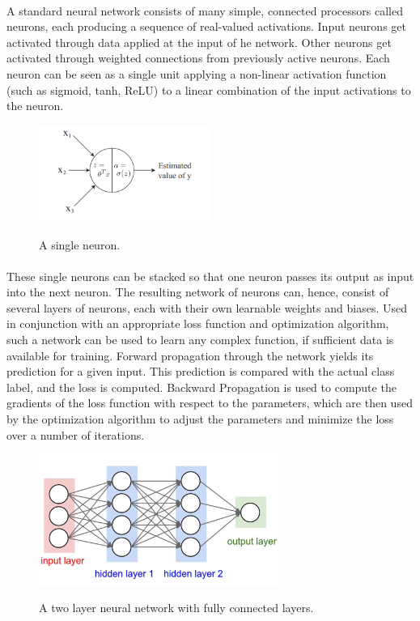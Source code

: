 \documentclass[12pt, a4paper]{report}
\begin{document}
\paragraph{}
A standard neural network consists of many simple, connected processors called neurons, each producing a sequence of real-valued activations. Input neurons get activated through data applied at the input of he network. Other neurons get activated through weighted connections from previously active neurons. \cite{schmidhuber2015deep} Each neuron can be seen as a single unit applying a non-linear activation function (such as sigmoid, tanh, ReLU) to a linear combination of the input activations to the neuron.\cite{cs229}
\begin{figure}[h]
\centering
\includegraphics[width=0.5\textwidth]{nn1.png}
\caption{A single neuron.}\cite{cs229}
\end{figure}
\paragraph{}
These single neurons can be stacked so that one neuron passes its output as input into the next neuron. The resulting network of neurons can, hence, consist of several layers of neurons, each with their own learnable weights and biases. Used in conjunction with an appropriate loss function and optimization algorithm, such a network can be used to learn any complex function, if sufficient data is available for training. Forward propagation through the network yields its prediction for a given input. This prediction is compared with the actual class label, and the loss is computed. Backward Propagation is used to compute the gradients of the loss function with respect to the parameters, which are then used by the optimization algorithm to adjust the parameters and minimize the loss over a number of iterations.
\begin{figure}[h]
\centering
\includegraphics[width=0.7\textwidth]{nn2.png}
\caption{A two layer neural network with fully connected layers.}\cite{cs231n}
\end{figure}
\end{document}
